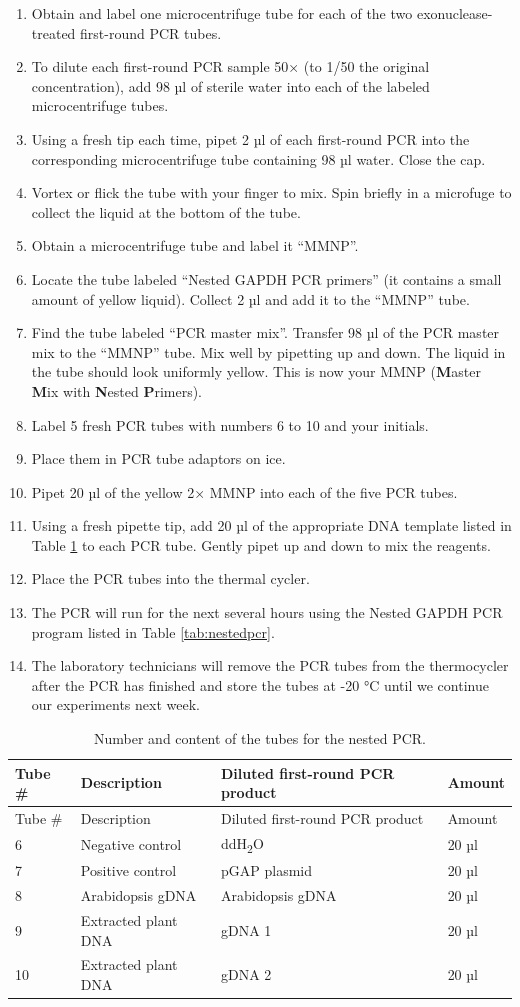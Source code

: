 \documentclass[]{book}
\providecommand{\tightlist}{%
  \setlength{\itemsep}{0pt}\setlength{\parskip}{0pt}}
\begin{document}
\begin{enumerate}
\def\labelenumi{\arabic{enumi}.}
\tightlist
\item
  Obtain and label one microcentrifuge tube for each of the two exonuclease-treated first-round PCR tubes.
\item
  To dilute each first-round PCR sample 50× (to 1/50 the original concentration), add 98 µl of sterile water into each of the labeled microcentrifuge tubes.
\item
  Using a fresh tip each time, pipet 2 µl of each first-round PCR into the corresponding microcentrifuge tube containing 98 µl water. Close the cap.
\item
  Vortex or flick the tube with your finger to mix. Spin briefly in a microfuge to collect the liquid at the bottom of the tube.
\item
  Obtain a microcentrifuge tube and label it ``MMNP''.
\item
  Locate the tube labeled ``Nested GAPDH PCR primers'' (it contains a small amount of yellow liquid). Collect 2 µl and add it to the ``MMNP'' tube.
\item
  Find the tube labeled ``PCR master mix''. Transfer 98 µl of the PCR master mix to the ``MMNP'' tube. Mix well by pipetting up and down. The liquid in the tube should look uniformly yellow. This is now your MMNP (\textbf{M}aster \textbf{M}ix with \textbf{N}ested \textbf{P}rimers).
\item
  Label 5 fresh PCR tubes with numbers 6 to 10 and your initials.
\item
  Place them in PCR tube adaptors on ice.
\item
  Pipet 20 µl of the yellow 2× MMNP into each of the five PCR tubes.
\item
  Using a fresh pipette tip, add 20 µl of the appropriate DNA template listed in Table \ref{tab:nestedtubes} to each PCR tube. Gently pipet up and down to mix the reagents.
\item
  Place the PCR tubes into the thermal cycler.
\item
  The PCR will run for the next several hours using the Nested GAPDH PCR program listed in Table \ref{tab:nestedpcr}.
\item
  The laboratory technicians will remove the PCR tubes from the thermocycler after the PCR has finished and store the tubes at -20 °C until we continue our experiments next week.
\end{enumerate}

\begin{longtable}[]{@{}llll@{}}
\caption{\label{tab:nestedtubes} Number and content of the tubes for the nested PCR.}\tabularnewline
\toprule
Tube \# & Description & Diluted first-round PCR product & Amount\tabularnewline
\midrule
\endfirsthead
\toprule
Tube \# & Description & Diluted first-round PCR product & Amount\tabularnewline
\midrule
\endhead
6 & Negative control & ddH\textsubscript{2}O & 20 µl\tabularnewline
7 & Positive control & pGAP plasmid & 20 µl\tabularnewline
8 & Arabidopsis gDNA & Arabidopsis gDNA & 20 µl\tabularnewline
9 & Extracted plant DNA & gDNA 1 & 20 µl\tabularnewline
10 & Extracted plant DNA & gDNA 2 & 20 µl\tabularnewline
\bottomrule
\end{longtable}
\end{document}

